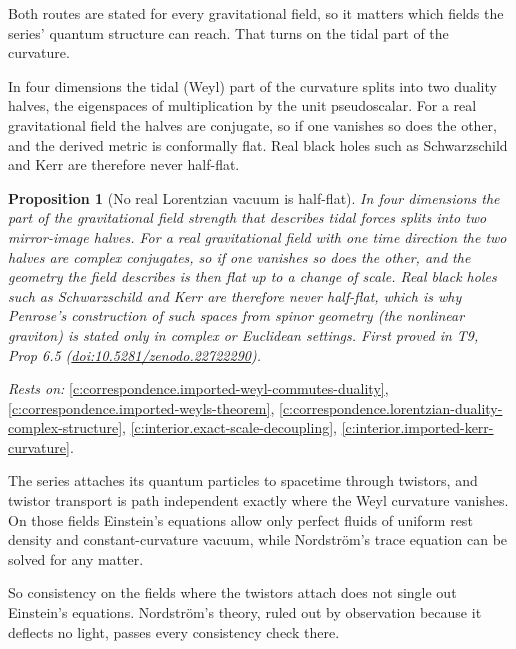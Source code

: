 \documentclass[11pt]{article}
\newtheorem{proposition}[theorem]{Proposition}
\theoremstyle{definition}
\theoremstyle{plain}
\begin{document}
Both routes are stated for every gravitational field, so it matters which fields the series' quantum structure can reach. That turns on the tidal part of the curvature.

In four dimensions the tidal (Weyl) part of the curvature splits into two duality halves, the eigenspaces of multiplication by the unit pseudoscalar. For a real gravitational field the halves are conjugate, so if one vanishes so does the other, and the derived metric is conformally flat. Real black holes such as Schwarzschild and Kerr are therefore never half-flat.

\begin{proposition}[No real Lorentzian vacuum is half-flat]\label{c:correspondence.no-real-lorentzian-vacuum-half-flat}
In four dimensions the part of the gravitational field strength that describes tidal forces splits into two mirror-image halves. For a real gravitational field with one time direction the two halves are complex conjugates, so if one vanishes so does the other, and the geometry the field describes is then flat up to a change of scale. Real black holes such as Schwarzschild and Kerr are therefore never half-flat, which is why Penrose's construction of such spaces from spinor geometry (the nonlinear graviton) is stated only in complex or Euclidean settings.
\emph{First proved in} T9, Prop 6.5 (\href{https://doi.org/10.5281/zenodo.22722290}{doi:10.5281/zenodo.22722290}).
\end{proposition}
\noindent\emph{Rests on:} \ref{c:correspondence.imported-weyl-commutes-duality}, \ref{c:correspondence.imported-weyls-theorem}, \ref{c:correspondence.lorentzian-duality-complex-structure}, \ref{c:interior.exact-scale-decoupling}, \ref{c:interior.imported-kerr-curvature}.

The series attaches its quantum particles to spacetime through twistors, and twistor transport is path independent exactly where the Weyl curvature vanishes. On those fields Einstein's equations allow only perfect fluids of uniform rest density and constant-curvature vacuum, while Nordstr\"om's trace equation can be solved for any matter.

So consistency on the fields where the twistors attach does not single out Einstein's equations. Nordstr\"om's theory, ruled out by observation because it deflects no light, passes every consistency check there.
\end{document}

